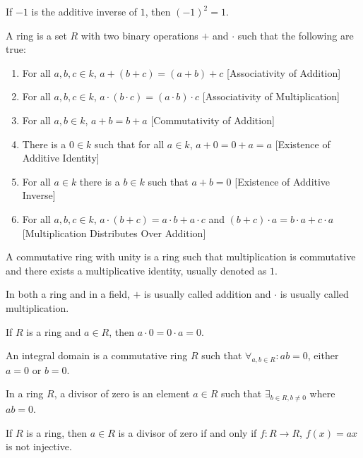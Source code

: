 \documentclass[../main.tex]{subfiles}
\begin{document}
%
\begin{theorem}
If $-1$ is the additive inverse of $1$, then $(-1)^2 = 1$.
\end{theorem}
%
\begin{definition}
A ring is a set $R$ with two binary operations $+$ and $\cdot$ such that the following are true:
\begin{enumerate}
\item For all $a,b,c\in k$, $a+(b+c)=(a+b)+c$ \hfill [Associativity of Addition]
\item For all $a,b,c\in k$, $a\cdot(b\cdot c) = (a\cdot b)\cdot c$ \hfill [Associativity of Multiplication]
\item For all $a,b\in k$, $a+b=b+a$ \hfill [Commutativity of Addition]
\item There is a $0 \in k$ such that for all $a\in k$, $a+0=0+a = a$ \hfill [Existence of Additive Identity]
\item For all $a\in k$ there is a $b\in k$ such that $a+b=0$ \hfill [Existence of Additive Inverse]
\item For all $a,b,c\in k$, $a\cdot(b+c) = a\cdot b + a\cdot c$ and $(b+c)\cdot a = b\cdot a + c\cdot a$ \hfill [Multiplication Distributes Over Addition]
\end{enumerate}
\end{definition}
%
\begin{definition}
A commutative ring with unity is a ring such that multiplication is commutative and there exists a multiplicative identity, usually denoted as $1$.
\end{definition}
%
\begin{remark}
In both a ring and in a field, $+$ is usually called addition and $\cdot$ is usually called multiplication.
\end{remark}
%
\begin{corollary}
If $R$ is a ring and $a\in R$, then $a\cdot 0 = 0\cdot a = 0$.
\end{corollary}
%
\begin{definition}
An integral domain is a commutative ring $R$ such that $\forall_{a,b\in R}:ab=0$, either $a=0$ or $b=0$.
\end{definition}
%
\begin{definition}
In a ring $R$, a divisor of zero is an element $a\in R$ such that $\exists_{b\in R,b\ne 0}$ where $ab=0$.
\end{definition}
%
\begin{theorem}
If $R$ is a ring, then $a\in R$ is a divisor of zero if and only if $f:R\rightarrow R$, $f(x) = a x$ is not injective.
\end{theorem}
\end{document}
